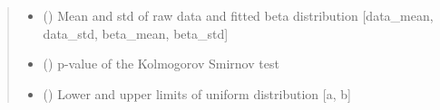 \documentclass[letterpaper,10pt,english,openany,oneside]{sphinxmanual}
\begin{document}
\begin{fulllineitems}
\begin{quote}
\begin{description}
\begin{itemize}
\item {} 
 () \textendash{} Mean and std of raw data and fitted beta distribution {[}data\_mean, data\_std, beta\_mean, beta\_std{]}

\item {} 
 () \textendash{} p-value of the Kolmogorov Smirnov test

\item {} 
 () \textendash{} Lower and upper limits of uniform distribution {[}a, b{]}

\end{itemize}


\end{description}\end{quote}

\end{fulllineitems}

\end{document}
